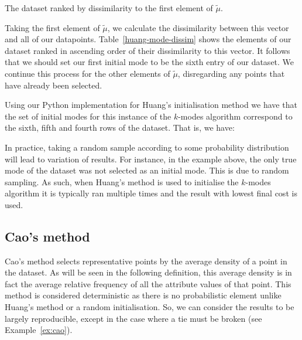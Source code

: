 \begin{example}
    \begin{table}[H]
    \centering
    \singlespacing{%
    \resizebox{.8\textwidth}{!}{%
        
    }}
    \caption{The dataset ranked by dissimilarity to the first element of
    \(\tilde{\mu}\).}\label{tab:huang-mode-dissim}
    \end{table}

    Taking the first element of \(\tilde{\mu}\), we calculate the dissimilarity
    between this vector and all of our datapoints. Table~\ref{huang-mode-dissim}
    shows the elements of our dataset ranked in ascending order of their
    dissimilarity to this vector. It follows that we should set our first
    initial mode to be the sixth entry of our dataset. We continue this process
    for the other elements of \(\tilde{\mu}\), disregarding any points that have
    already been selected.
    
    Using our Python implementation for Huang's initialisation method we have 
    that the set of initial modes for this instance of the \(k\)-modes algorithm
    correspond to the sixth, fifth and fourth rows of the dataset. That is, we
    have:

    
\end{example}

\begin{remark}
    In practice, taking a random sample according to some probability
    distribution will lead to variation of results. For instance, in the example
    above, the only true mode of the dataset was not selected as an initial
    mode. This is due to random sampling. As such, when Huang's method is used
    to initialise the \(k\)-modes algorithm it is typically ran multiple times
    and the result with lowest final cost is used.
\end{remark}

\subsection{Cao's method}\label{subsec:cao}

Cao's method selects representative points by the average density of a point in
the dataset. As will be seen in the following definition, this average density 
is in fact the average relative frequency of all the attribute values of that 
point. This method is considered deterministic as there is no probabilistic 
element \- unlike Huang's method or a random initialisation. So, we can consider
the results to be largely reproducible, except in the case where a tie must be
broken (see Example~\ref{ex:cao}).

